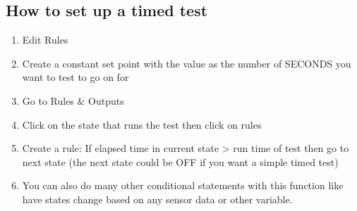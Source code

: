 \documentclass[letterpaper,10pt,english]{sphinxmanual}
\begin{document}
\subsection{How to set up a timed test}
\label{\detokenize{ProCoDA/ProCoDA:how-to-set-up-a-timed-test}}\begin{enumerate}
\item {} 
Edit Rules

\item {} 
Create a constant set point with the value as the number of SECONDS you want to test to go on for

\item {} 
Go to Rules \& Outputs

\item {} 
Click on the state that runs the test then click on rules

\item {} 
Create a rule: If elapsed time in current state \textgreater{} run time of test then go to next state (the next state could be OFF if you want a simple timed test)

\item {} 
You can also do many other conditional statements with this function like have states change based on any sensor data or other variable.

\end{enumerate}
\end{document}
